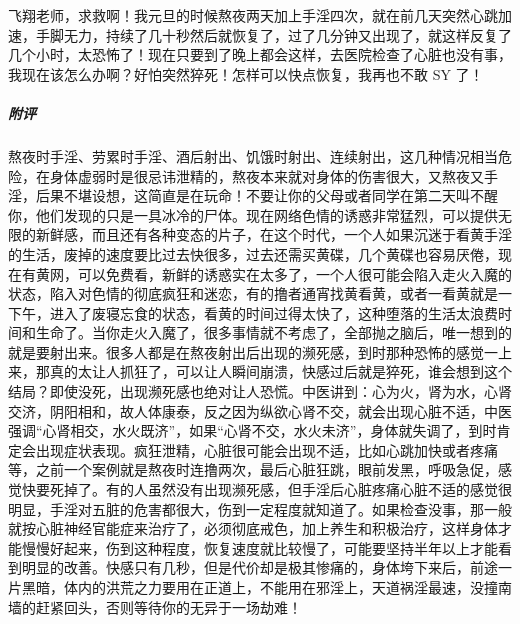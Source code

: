 \begin{case}
    飞翔老师，求救啊！我元旦的时候熬夜两天加上手淫四次，就在前几天突然心跳加速，手脚无力，持续了几十秒然后就恢复了，过了几分钟又出现了，就这样反复了几个小时，太恐怖了！现在只要到了晚上都会这样，去医院检查了心脏也没有事，我现在该怎么办啊？好怕突然猝死！怎样可以快点恢复，我再也不敢 SY 了！
    \subparagraph{附评} 熬夜时手淫、劳累时手淫、酒后射出、饥饿时射出、连续射出，这几种情况相当危险，在身体虚弱时是很忌讳泄精的，熬夜本来就对身体的伤害很大，又熬夜又手淫，后果不堪设想，这简直是在玩命！不要让你的父母或者同学在第二天叫不醒你，他们发现的只是一具冰冷的尸体。现在网络色情的诱惑非常猛烈，可以提供无限的新鲜感，而且还有各种变态的片子，在这个时代，一个人如果沉迷于看黄手淫的生活，废掉的速度要比过去快很多，过去还需买黄碟，几个黄碟也容易厌倦，现在有黄网，可以免费看，新鲜的诱惑实在太多了，一个人很可能会陷入走火入魔的状态，陷入对色情的彻底疯狂和迷恋，有的撸者通宵找黄看黄，或者一看黄就是一下午，进入了废寝忘食的状态，看黄的时间过得太快了，这种堕落的生活太浪费时间和生命了。当你走火入魔了，很多事情就不考虑了，全部抛之脑后，唯一想到的就是要射出来。很多人都是在熬夜射出后出现的濒死感，到时那种恐怖的感觉一上来，那真的太让人抓狂了，可以让人瞬间崩溃，快感过后就是猝死，谁会想到这个结局？即使没死，出现濒死感也绝对让人恐慌。中医讲到：心为火，肾为水，心肾交济，阴阳相和，故人体康泰，反之因为纵欲心肾不交，就会出现心脏不适，中医强调“心肾相交，水火既济”，如果“心肾不交，水火未济”，身体就失调了，到时肯定会出现症状表现。疯狂泄精，心脏很可能会出现不适，比如心跳加快或者疼痛等，之前一个案例就是熬夜时连撸两次，最后心脏狂跳，眼前发黑，呼吸急促，感觉快要死掉了。有的人虽然没有出现濒死感，但手淫后心脏疼痛心脏不适的感觉很明显，手淫对五脏的危害都很大，伤到一定程度就知道了。如果检查没事，那一般就按心脏神经官能症来治疗了，必须彻底戒色，加上养生和积极治疗，这样身体才能慢慢好起来，伤到这种程度，恢复速度就比较慢了，可能要坚持半年以上才能看到明显的改善。快感只有几秒，但是代价却是极其惨痛的，身体垮下来后，前途一片黑暗，体内的洪荒之力要用在正道上，不能用在邪淫上，天道祸淫最速，没撞南墙的赶紧回头，否则等待你的无异于一场劫难！
\end{case}

